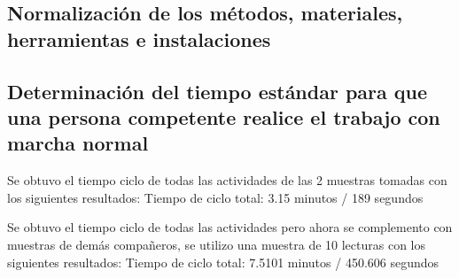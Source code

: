     \subsection{Normalización de los métodos, materiales, herramientas e instalaciones}
    
    \subsection{Determinación del tiempo estándar para que una persona competente realice el trabajo con marcha normal}
    
    Se obtuvo el tiempo ciclo de todas las actividades de las 2 muestras tomadas con los siguientes resultados: 
    \newline
    Tiempo de ciclo total: 3.15 minutos / 189 segundos
    
    
    Se obtuvo el tiempo ciclo de todas las actividades pero ahora se complemento con muestras de demás compañeros, se utilizo una muestra de 10 lecturas con los siguientes resultados: 
    \newline
    Tiempo de ciclo total: 7.5101 minutos / 450.606 segundos
    
    
